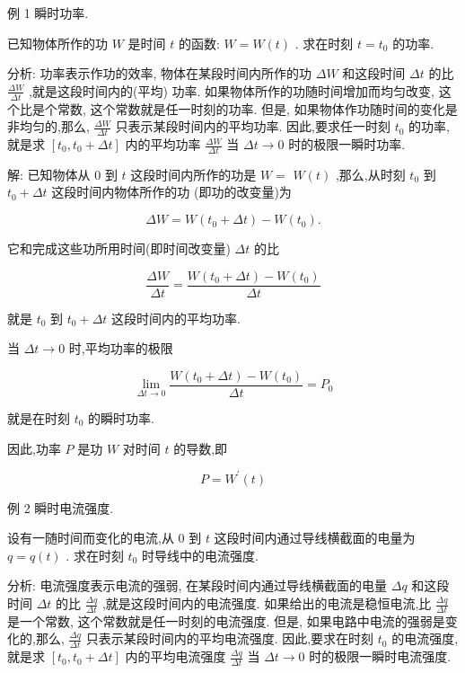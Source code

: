 \documentclass[10pt]{article}
\begin{document}
例 1 瞬时功率.

已知物体所作的功 \(W\) 是时间 \(t\) 的函数: \(W = W\left( t\right)\) . 求在时刻 \(t = {t}_{0}\) 的功率.

分析: 功率表示作功的效率, 物体在某段时间内所作的功 \({\Delta W}\) 和这段时间 \({\Delta t}\) 的比 \(\frac{\Delta W}{\Delta t}\) ,就是这段时间内的(平均) 功率. 如果物体所作的功随时间增加而均匀改变, 这个比是个常数, 这个常数就是任一时刻的功率. 但是, 如果物体作功随时间的变化是非均匀的,那么, \(\frac{\Delta W}{\Delta t}\) 只表示某段时间内的平均功率. 因此,要求任一时刻 \({t}_{0}\) 的功率,就是求 \(\left\lbrack {{t}_{0},{t}_{0} + {\Delta t}}\right\rbrack\) 内的平均功率 \(\frac{\Delta W}{\Delta t}\) 当 \({\Delta t} \rightarrow 0\) 时的极限一瞬时功率.

解: 已知物体从 0 到 \(t\) 这段时间内所作的功是 \(W =\) \(W\left( t\right)\) ,那么,从时刻 \({t}_{0}\) 到 \({t}_{0} + {\Delta t}\) 这段时间内物体所作的功 (即功的改变量)为

\[
{\Delta W} = W\left( {{t}_{0} + {\Delta t}}\right) - W\left( {t}_{0}\right) .
\]

它和完成这些功所用时间(即时间改变量) \({\Delta t}\) 的比

\[
\frac{\Delta W}{\Delta t} = \frac{W\left( {{t}_{0} + {\Delta t}}\right) - W\left( {t}_{0}\right) }{\Delta t}
\]

就是 \({t}_{0}\) 到 \({t}_{0} + {\Delta t}\) 这段时间内的平均功率.

当 \({\Delta t} \rightarrow 0\) 时,平均功率的极限

\[
\mathop{\lim }\limits_{{{\Delta t} \rightarrow 0}}\frac{W\left( {{t}_{0} + {\Delta t}}\right) - W\left( {t}_{0}\right) }{\Delta t} = {P}_{0}
\]

就是在时刻 \({t}_{0}\) 的瞬时功率.

因此,功率 \(P\) 是功 \(W\) 对时间 \(t\) 的导数,即

\[
P = {W}^{\prime }\left( t\right)
\]

例 2 瞬时电流强度.

设有一随时间而变化的电流,从 0 到 \(t\) 这段时间内通过导线横截面的电量为 \(q = q\left( t\right)\) . 求在时刻 \({t}_{0}\) 时导线中的电流强度.

分析: 电流强度表示电流的强弱, 在某段时间内通过导线横截面的电量 \({\Delta q}\) 和这段时间 \({\Delta t}\) 的比 \(\frac{\Delta q}{\Delta t}\) ,就是这段时间内的电流强度. 如果给出的电流是稳恒电流,比 \(\frac{\Delta q}{\Delta t}\) 是一个常数, 这个常数就是任一时刻的电流强度. 但是, 如果电路中电流的强弱是变化的,那么, \(\frac{\Delta q}{\Delta t}\) 只表示某段时间内的平均电流强度. 因此,要求在时刻 \({t}_{0}\) 的电流强度,就是求 \(\left\lbrack {{t}_{0},{t}_{0} + {\Delta t}}\right\rbrack\) 内的平均电流强度 \(\frac{\Delta q}{\Delta t}\) 当 \({\Delta t} \rightarrow 0\) 时的极限一瞬时电流强度.
\end{document}
